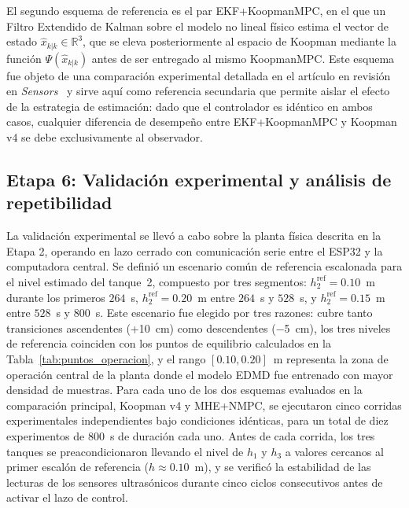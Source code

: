 \documentclass[12pt,letterpaper]{article}
\begin{document}
El segundo esquema de referencia es el par EKF+KoopmanMPC, en el que un 
Filtro Extendido de Kalman sobre el modelo no lineal físico estima el 
vector de estado $\hat{x}_{k|k} \in \mathbb{R}^3$, que se eleva 
posteriormente al espacio de Koopman mediante la función $\Psi(\hat{x}_{k|k})$ 
antes de ser entregado al mismo KoopmanMPC. Este esquema fue objeto de una 
comparación experimental detallada en el artículo en revisión en 
\textit{Sensors}~\cite{hernandez2025sensors} y sirve aquí como referencia 
secundaria que permite aislar el efecto de la estrategia de estimación: 
dado que el controlador es idéntico en ambos casos, cualquier diferencia 
de desempeño entre EKF+KoopmanMPC y Koopman v4 se debe exclusivamente al 
observador.

\subsection{Etapa 6: Validación experimental y análisis de repetibilidad}
\label{sec:validacion}
La validación experimental se llevó a cabo sobre la planta física 
descrita en la Etapa 2, operando en lazo cerrado con comunicación serie 
entre el ESP32 y la computadora central. Se definió un escenario común de 
referencia escalonada para el nivel estimado del tanque~2, compuesto por 
tres segmentos: $h_2^{\mathrm{ref}} = 0.10$~m durante los primeros 
$264$~s, $h_2^{\mathrm{ref}} = 0.20$~m entre $264$~s y $528$~s, y 
$h_2^{\mathrm{ref}} = 0.15$~m entre $528$~s y $800$~s. Este escenario 
fue elegido por tres razones: cubre tanto transiciones ascendentes 
(+10~cm) como descendentes ($-$5~cm), los tres niveles de referencia 
coinciden con los puntos de equilibrio calculados en la 
Tabla~\ref{tab:puntos_operacion}, y el rango $[0.10, 0.20]$~m representa 
la zona de operación central de la planta donde el modelo EDMD fue 
entrenado con mayor densidad de muestras.
Para cada uno de los dos esquemas evaluados en la comparación principal,
Koopman v4 y MHE+NMPC, se ejecutaron cinco corridas experimentales
independientes bajo condiciones idénticas, para un total de diez 
experimentos de $800$~s de duración cada uno. Antes de cada corrida, los 
tres tanques se preacondicionaron llevando el nivel de $h_1$ y $h_3$ a 
valores cercanos al primer escalón de referencia ($h \approx 0.10$~m), y 
se verificó la estabilidad de las lecturas de los sensores ultrasónicos 
durante cinco ciclos consecutivos antes de activar el lazo de control. 
\end{document}
